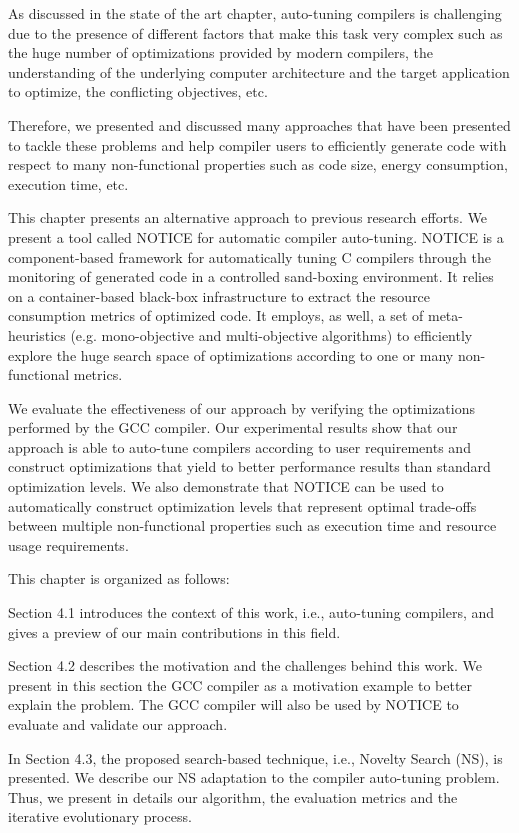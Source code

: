 
As discussed in the state of the art chapter, auto-tuning compilers is challenging due to the presence of different factors that make this task very complex such as the huge number of optimizations provided by modern compilers, the understanding of the underlying computer architecture and the target application to optimize, the conflicting objectives, etc. 

Therefore, we presented and discussed many approaches that have been presented to tackle these problems and help compiler users to efficiently generate code with respect to many non-functional properties such as code size, energy consumption, execution time, etc. 
	
This chapter presents an alternative approach to previous research efforts. 
We present a tool called NOTICE for automatic compiler auto-tuning. 
NOTICE is a component-based framework for automatically tuning C compilers through the monitoring of generated code in a controlled sand-boxing environment. 
It relies on a container-based black-box infrastructure to extract the resource consumption metrics of optimized code. 
It employs, as well, a set of meta-heuristics (e.g. mono-objective and multi-objective algorithms) to efficiently explore the huge search space of optimizations according to one or many non-functional metrics.

We evaluate the effectiveness of our approach by verifying the optimizations performed by the GCC compiler.
Our experimental results show that our approach is able to auto-tune compilers according to user requirements and construct optimizations that yield to better performance results than standard optimization levels.
We also demonstrate that NOTICE can be used to automatically construct optimization levels that represent optimal trade-offs between multiple non-functional properties such as execution time and resource usage requirements.

This chapter is organized as follows: 

Section 4.1 introduces the context of this work, i.e., auto-tuning compilers, and gives a preview of our main contributions in this field.

Section 4.2 describes the motivation and the challenges behind this work. We present in this section the GCC compiler as a motivation example to better explain the problem. The GCC compiler will also be used by NOTICE to evaluate and validate our approach. 

In Section 4.3, the proposed search-based technique, i.e., Novelty Search (NS), is presented. We describe our NS adaptation to the compiler auto-tuning problem. Thus, we present in details our algorithm, the evaluation metrics and the iterative evolutionary process. 

